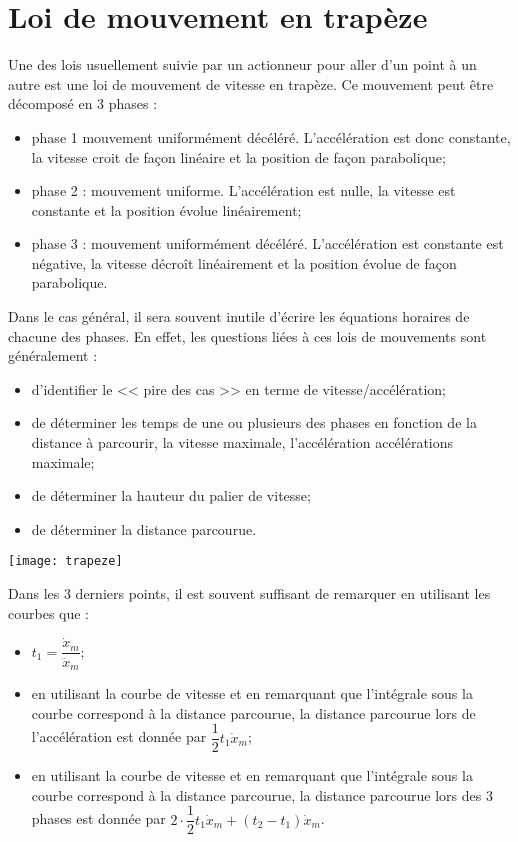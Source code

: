 \section{Loi de mouvement en trapèze}
\noindent
\begin{minipage}[c]{.48\linewidth}
Une des lois usuellement suivie par un actionneur pour aller d'un point à un autre est une loi de mouvement de vitesse en trapèze.  Ce mouvement peut être décomposé en 3 phases : 
\begin{itemize}
\item phase 1 mouvement uniformément décéléré. L'accélération est donc constante, la vitesse croit de façon linéaire et la position de façon parabolique;
\item phase 2 : mouvement uniforme. L'accélération est nulle, la vitesse est constante et la position évolue linéairement;
\item phase 3 : mouvement uniformément décéléré. L'accélération est constante est négative, la vitesse décroît linéairement et la position évolue de façon parabolique. 
\end{itemize}


Dans le cas général, il sera souvent inutile d'écrire les équations horaires de chacune des phases. En effet, les questions liées à ces lois de mouvements sont généralement :
\begin{itemize}
\item d'identifier le << pire des cas >> en terme de vitesse/accélération;
\item de déterminer les temps de une ou plusieurs des phases en fonction de la distance à parcourir, la vitesse maximale, l'accélération accélérations maximale;
\item de déterminer la hauteur du palier de vitesse;
\item de déterminer la distance parcourue. 
\end{itemize}
\end{minipage}\hfill
\begin{minipage}[c]{.48\linewidth}
\begin{center}
\texttt{[image: trapeze]}
\end{center}
\end{minipage}
\begin{resultat}
Dans les 3 derniers points, il est souvent suffisant de remarquer en utilisant les courbes que : 
\begin{itemize}
\item $t_1=\dfrac{\dot{x}_m}{\ddot{x}_m}$;
\item en utilisant la courbe de vitesse et en remarquant que l'intégrale sous la courbe correspond à la distance parcourue, la distance parcourue lors de l'accélération est donnée par $\dfrac{1}{2}t_1\dot{x}_m$;
\item en utilisant la courbe de vitesse et en remarquant que l'intégrale sous la courbe correspond à la distance parcourue, la distance parcourue lors des 3 phases est donnée par $2\cdot \dfrac{1}{2}t_1\dot{x}_m+\left(t_2-t_1\right)\dot{x}_m$.
\end{itemize}
\end{resultat}


